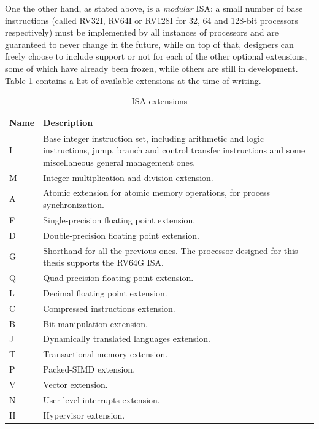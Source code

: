 One the other hand, as stated above, \riscv is a \emph{modular} ISA: a small number of base instructions (called RV32I, RV64I or RV128I for 32, 64 and 128-bit processors respectively) must be implemented by all instances of \riscv processors and are guaranteed to never change in the future, while on top of that, designers can freely choose to include support or not for each of the other optional extensions, some of which have already been frozen, while others are still in development. Table \ref{tab:extensions} contains a list of available extensions at the time of writing.

\begin{table}[hbtp]
  \centering
  \begin{tabular}{p{}
                  p{}}
    \toprule
    \textbf{Name} & \textbf{Description} \\ \hline
    I             & Base integer instruction set, including arithmetic and logic instructions, jump, branch and control transfer instructions and some miscellaneous general management ones. \\
    M             & Integer multiplication and division extension. \\
    A             & Atomic extension for atomic memory operations, for process synchronization. \\
    F             & Single-precision floating point extension. \\
    D             & Double-precision floating point extension. \\
    G             & Shorthand for all the previous ones. The processor designed for this thesis supports the RV64G ISA. \\
    Q             & Quad-precision floating point extension. \\
    L             & Decimal floating point extension. \\
    C             & Compressed instructions extension. \\
    B             & Bit manipulation extension. \\
    J             & Dynamically translated languages extension. \\
    T             & Transactional memory extension. \\
    P             & Packed-SIMD extension. \\
    V             & Vector extension. \\
    N             & User-level interrupts extension. \\
    H             & Hypervisor extension. \\
    \bottomrule
  \end{tabular}
  \caption{\riscv ISA extensions \cite{reader}}
  \label{tab:extensions}
\end{table}

